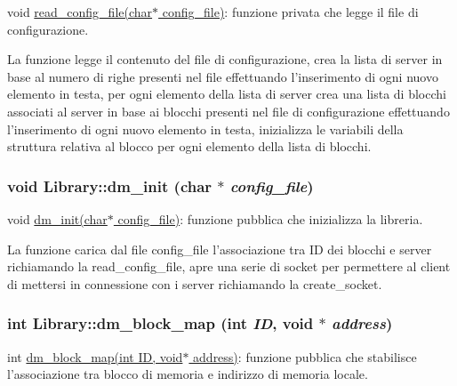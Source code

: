 void \hyperlink{classLibrary_e64f3f91067ea280395d09420d961901_e64f3f91067ea280395d09420d961901}{read\_\-config\_\-file(char$\ast$ config\_\-file)}: funzione privata che legge il file di configurazione. 

La funzione legge il contenuto del file di configurazione, crea la lista di server in base al numero di righe presenti nel file effettuando l'inserimento di ogni nuovo elemento in testa, per ogni elemento della lista di server crea una lista di blocchi associati al server in base ai blocchi presenti nel file di configurazione effettuando l'inserimento di ogni nuovo elemento in testa, inizializza le variabili della struttura relativa al blocco per ogni elemento della lista di blocchi. \hypertarget{classLibrary_ddfd88aedfe05852d065db2644172c52_ddfd88aedfe05852d065db2644172c52}{
\subsubsection[{dm\_\-init}]{\setlength{\rightskip}{0pt plus 5cm}void Library::dm\_\-init (char $\ast$ {\em config\_\-file})}}
\label{classLibrary_ddfd88aedfe05852d065db2644172c52_ddfd88aedfe05852d065db2644172c52}


void \hyperlink{classLibrary_ddfd88aedfe05852d065db2644172c52_ddfd88aedfe05852d065db2644172c52}{dm\_\-init(char$\ast$ config\_\-file)}: funzione pubblica che inizializza la libreria. 

La funzione carica dal file config\_\-file l'associazione tra ID dei blocchi e server richiamando la read\_\-config\_\-file, apre una serie di socket per permettere al client di mettersi in connessione con i server richiamando la create\_\-socket. \hypertarget{classLibrary_e65e1654765c8a7d764ea9638b735c6f_e65e1654765c8a7d764ea9638b735c6f}{
\subsubsection[{dm\_\-block\_\-map}]{\setlength{\rightskip}{0pt plus 5cm}int Library::dm\_\-block\_\-map (int {\em ID}, \/  void $\ast$ {\em address})}}
\label{classLibrary_e65e1654765c8a7d764ea9638b735c6f_e65e1654765c8a7d764ea9638b735c6f}


int \hyperlink{classLibrary_e65e1654765c8a7d764ea9638b735c6f_e65e1654765c8a7d764ea9638b735c6f}{dm\_\-block\_\-map(int ID, void$\ast$ address)}: funzione pubblica che stabilisce l'associazione tra blocco di memoria e indirizzo di memoria locale. 

